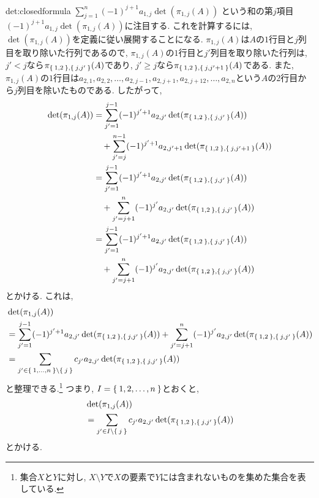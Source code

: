 \begin{proofof}{det:closedformula}
  $\sum_{j=1}^{n}(-1)^{j+1}a_{1,j}\det(\pi_{1,j}(A))$ 
  という和の第$j$項目$(-1)^{j+1}a_{1,j}\det(\pi_{1,j}(A))$に注目する.
  これを計算するには,
  $\det(\pi_{1,j}(A))$を定義に従い展開することになる.
  $\pi_{1,j}(A)$は$A$の$1$行目と$j$列目を取り除いた行列であるので,
  $\pi_{1,j}(A)$の$1$行目と$j'$列目を取り除いた行列は,
  $j'<j$なら$\pi_{\Set{1,2},\Set{j,j'}}(A)$であり,
  $j'\geq j$なら$\pi_{\Set{1,2},\Set{j,j'+1}}(A)$である.
  また,
  $\pi_{1,j}(A)$の$1$行目は$a_{2,1},a_{2,2},\ldots,a_{2,j-1},a_{2,j+1},a_{2,j+12},\ldots,a_{2,n}$という$A$の2行目から$j$列目を除いたものである.
  したがって,
  \begin{align*}
    \det(\pi_{1,j}(A))
    &=
    \sum_{j'=1}^{j-1}(-1)^{j'+1}a_{2,j'}\det(\pi_{\Set{1,2},\Set{j,j'}}(A))
    \\&\quad+\sum_{j'=j}^{n-1}(-1)^{j'+1}a_{2,j'+1}\det(\pi_{\Set{1,2},\Set{j,j'+1}}(A))\\
    &=
    \sum_{j'=1}^{j-1}(-1)^{j'+1}a_{2,j'}\det(\pi_{\Set{1,2},\Set{j,j'}}(A))
    \\&\quad+\sum_{j'=j+1}^{n}(-1)^{j'}a_{2,j'}\det(\pi_{\Set{1,2},\Set{j,j'}}(A))\\
    &=
    \sum_{j'=1}^{j-1}(-1)^{j'+1}a_{2,j'}\det(\pi_{\Set{1,2},\Set{j,j'}}(A))
    \\&\quad+\sum_{j'=j+1}^{n}(-1)^{j'}a_{2,j'}\det(\pi_{\Set{1,2},\Set{j,j'}}(A))
  \end{align*}
  とかける. これは,
  \begin{align*}
    &\det(\pi_{1,j}(A))\\
    &=
    \sum_{j'=1}^{j-1}(-1)^{j'+1}a_{2,j'}\det(\pi_{\Set{1,2},\Set{j,j'}}(A))
    +\sum_{j'=j+1}^{n}(-1)^{j'}a_{2,j'}\det(\pi_{\Set{1,2},\Set{j,j'}}(A))\\
    &=
    \sum_{j'\in \Set{1,\ldots,n}\setminus\Set{j}} c_{j'} a_{2,j'}\det(\pi_{\Set{1,2},\Set{j,j'}}(A))
  \end{align*}
  と整理できる.\footnote{集合$X$と$Y$に対し,
  $X\setminus Y$で$X$の要素で$Y$には含まれないものを集めた集合を表している.}
  つまり, $I=\Set{1,2,\ldots,n}$とおくと,
  \begin{align*}
    &\det(\pi_{1,j}(A))\\
    &=
    \sum_{j'\in I\setminus\Set{j}} c_{j'} a_{2,j'}\det(\pi_{\Set{1,2},\Set{j,j'}}(A))
  \end{align*}
  とかける.
  


\end{proofof}
